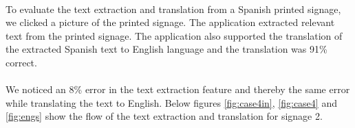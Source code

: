 \documentclass[12pt]{article}
\begin{document}
\paragraph{}To evaluate the text extraction and translation from a Spanish printed signage, we clicked a picture of the printed signage. The application extracted relevant text from the printed signage. The application also supported the translation of the extracted Spanish text to English language and the translation was 91\% correct.

\paragraph{}We noticed an 8\% error in the text extraction feature and thereby the same error while translating the text to English. Below figures \ref{fig:case4in}, \ref{fig:case4} and \ref{fig:engs} show the flow of the text extraction and translation for signage 2.
\end{document}

